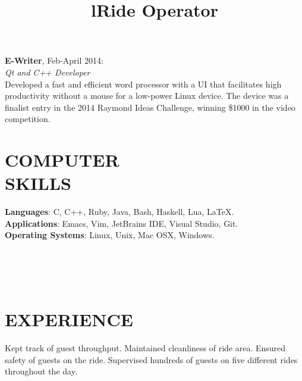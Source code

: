 \documentclass[margin]{res}
\begin{document}
\begin{resume}
\par
\textbf{E-Writer}, Feb-April 2014:\\
{\sl Qt and C++ Developer}\\
Developed a fast and efficient word processor with a UI that facilitates high
productivity without a mouse for a low-power Linux device. The device was a finalist
entry in the 2014 Raymond Ideas Challenge, winning \$1000 in the video competition.

\section{COMPUTER\\SKILLS}

\textbf{Languages}: C, C++, Ruby, Java, Bash, Haskell, Lua, \LaTeX. \\
\textbf{Applications}: Emacs, Vim, JetBrains IDE, Visual Studio, Git. \\
\textbf{Operating Systems}: Linux, Unix, Mac OSX, Windows.

\begin{format}
\title{l}\\
\\
\body\\
\end{format}

\section{EXPERIENCE}
\title{\textbf{Ride Operator}}
\begin{position}
Kept track of guest throughput. Maintained cleanliness of ride area. Ensured safety
of guests on the ride. Supervised hundreds of guests on five different rides
throughout the day.
\end{position}


\end{resume}
\end{document}
